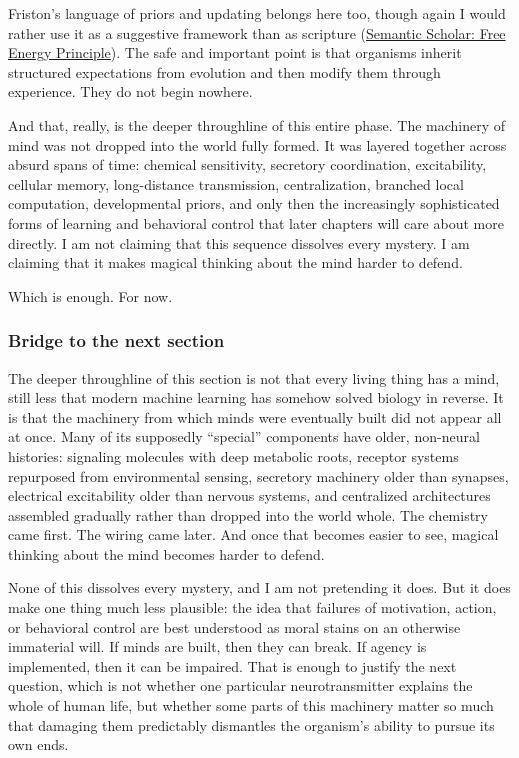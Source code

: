 Friston's language of priors and updating belongs here too, though again I would rather use it as a suggestive framework than as scripture (\href{https://www.semanticscholar.org/paper/The-free-energy-principle:-a-unified-brain-theory-Friston/1ed6a4a10589618d4f26350f1a296ee767ceff6b}{Semantic Scholar: Free Energy Principle}). The safe and important point is that organisms inherit structured expectations from evolution and then modify them through experience. They do not begin nowhere.

And that, really, is the deeper throughline of this entire phase. The machinery of mind was not dropped into the world fully formed. It was layered together across absurd spans of time: chemical sensitivity, secretory coordination, excitability, cellular memory, long-distance transmission, centralization, branched local computation, developmental priors, and only then the increasingly sophisticated forms of learning and behavioral control that later chapters will care about more directly. I am not claiming that this sequence dissolves every mystery. I am claiming that it makes magical thinking about the mind harder to defend.

Which is enough. For now.

\subsubsection{Bridge to the next section}\label{03_it_started-bridge-to-the-next-section}

The deeper throughline of this section is not that every living thing has a mind, still less that modern machine learning has somehow solved biology in reverse. It is that the machinery from which minds were eventually built did not appear all at once. Many of its supposedly ``special'' components have older, non-neural histories: signaling molecules with deep metabolic roots, receptor systems repurposed from environmental sensing, secretory machinery older than synapses, electrical excitability older than nervous systems, and centralized architectures assembled gradually rather than dropped into the world whole. The chemistry came first. The wiring came later. And once that becomes easier to see, magical thinking about the mind becomes harder to defend.

None of this dissolves every mystery, and I am not pretending it does. But it does make one thing much less plausible: the idea that failures of motivation, action, or behavioral control are best understood as moral stains on an otherwise immaterial will. If minds are built, then they can break. If agency is implemented, then it can be impaired. That is enough to justify the next question, which is not whether one particular neurotransmitter explains the whole of human life, but whether some parts of this machinery matter so much that damaging them predictably dismantles the organism's ability to pursue its own ends.

